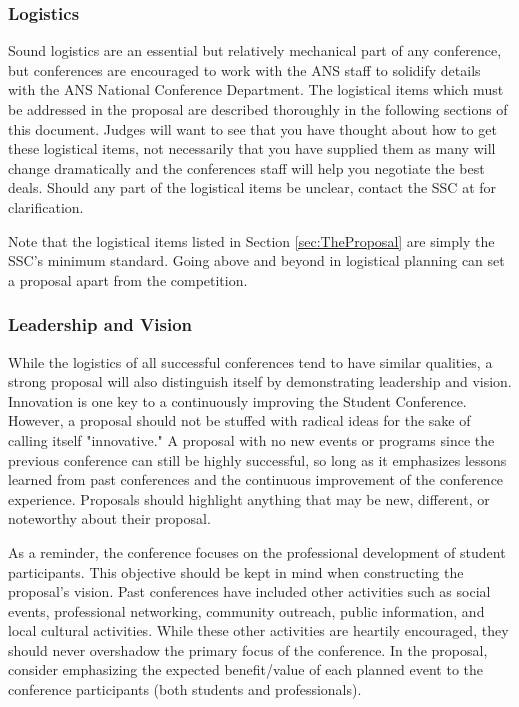 \documentclass[12pt]{article}
\begin{document}
\subsubsection{Logistics}
Sound logistics are an essential but relatively mechanical part of any conference, but conferences are encouraged to work with the ANS staff to solidify details with the ANS National Conference Department. The logistical items which must be addressed in the proposal are described thoroughly in the following sections of this document. Judges will want to see that you have thought about how to get these logistical items, not necessarily that you have supplied them as many will change dramatically and the conferences staff will help you negotiate the best deals. Should any part of the logistical items be unclear, contact the SSC at for clarification.

Note that the logistical items listed in Section \ref{sec:TheProposal} are simply the SSC’s minimum standard. Going above and beyond in logistical planning can set a proposal apart from the competition.

\subsubsection{Leadership and Vision} \label{sec:LandV}
While the logistics of all successful conferences tend to have similar qualities, a strong proposal will also distinguish itself by demonstrating leadership and vision. Innovation is one key to a continuously improving the Student Conference. However, a proposal should not be stuffed with radical ideas for the sake of calling itself "innovative." A proposal with no new events or programs since the previous conference can still be highly successful, so long as it emphasizes lessons learned from past conferences and the continuous improvement of the conference experience. Proposals should highlight anything that may be new, different, or noteworthy about their proposal.

As a reminder, the conference focuses on the professional development of student participants. This objective should be kept in mind when constructing the proposal's vision. Past conferences have included other activities such as social events, professional networking, community outreach, public information, and local cultural activities. While these other activities are heartily encouraged, they should never overshadow the primary focus of the conference. In the proposal, consider emphasizing the expected benefit/value of each planned event to the conference participants (both students and professionals).
\end{document}
